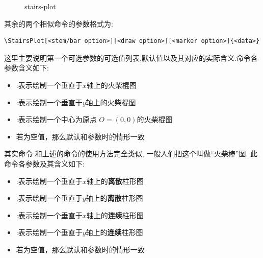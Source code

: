 \begin{figure}
    \centering
    \caption{stairs-plot}
    \label{fig:stairs-plot}
\end{figure}

其余的两个相似命令\cmd{\StemPlot, \BarPlot}的参数格式为:
\begin{verbatim}
\StairsPlot[<stem/bar option>][<draw option>][<marker option>]{<data>}
\end{verbatim}

这里主要说明第一个可选参数的可选值列表,默认值以及其对应的实际含义.\cmd{\StemPlot}命令各参数含义如下:
\begin{itemize}
    \item {}:表示绘制一个垂直于$x$轴上的火柴棍图
    \item {}:表示绘制一个垂直于$y$轴上的火柴棍图
    \item {}:表示绘制一个中心为原点 $O=(0,0)$的火柴棍图
    \item 若为空值，那么默认和参数时的情形一致
\end{itemize}

其实命令 \cmd{\BarPlot} 和上述的\cmd{\Stemplot}命令的使用方法完全类似, 一般人们把这个叫做``火柴棒''图.
此命令各参数及其含义如下:
\begin{itemize}
    \item {}:表示绘制一个垂直于$x$轴上的{\bf 离散}柱形图
    \item {}:表示绘制一个垂直于$y$轴上的{\bf 离散}柱形图
    \item {}:表示绘制一个垂直于$x$轴上的{\bf 连续}柱形图
    \item {}:表示绘制一个垂直于$y$轴上的{\bf 连续}柱形图
    \item 若为空值，那么默认和参数时的情形一致
\end{itemize}

